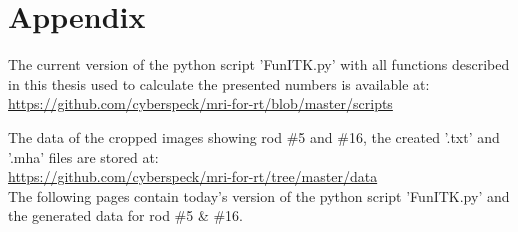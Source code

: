 \chapter*{Appendix}

The current version of the python script 'FunITK.py' with all functions described in this thesis used to calculate the presented numbers is available at:\\
\url{https://github.com/cyberspeck/mri-for-rt/blob/master/scripts}

The data of the cropped images showing rod \#5 and \#16, the created '.txt' and '.mha' files are stored at: \\ \url{https://github.com/cyberspeck/mri-for-rt/tree/master/data} \\

The following pages contain today's version of the python script 'FunITK.py' and the generated data for rod \#5 \& \#16.